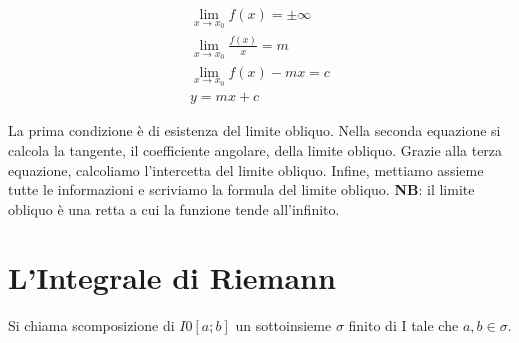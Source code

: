 \documentclass{article}
\begin{document}
\begin{gather}
	\lim_{x \to x_0}f(x)= \pm \infty \\
	\lim_{x \to x_0}\frac{f(x)}{x}= m \\
	\lim_{x \to x_0}f(x)- mx= c \\
	y= mx + c
\end{gather}

La prima condizione è di esistenza del limite obliquo. Nella seconda equazione si calcola la tangente, il coefficiente angolare, della limite obliquo. Grazie alla terza equazione, calcoliamo l'intercetta del limite obliquo. Infine, mettiamo assieme tutte le informazioni e scriviamo la formula del limite obliquo. \textbf{NB}: il limite obliquo è una retta a cui la funzione tende all'infinito.\\

\section{L'Integrale di Riemann}

Si chiama scomposizione di $I0[a;b]$ un sottoinsieme $\sigma$ finito di I tale che $a,b \in \sigma$.\\
\end{document}
